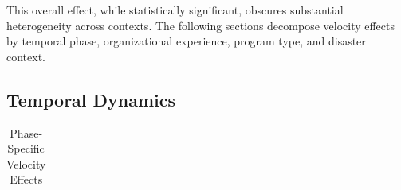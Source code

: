 \documentclass[
  12pt,
  letterpaper,
]{article}
\begin{document}
This overall effect, while statistically significant, obscures
substantial heterogeneity across contexts. The following sections
decompose velocity effects by temporal phase, organizational experience,
program type, and disaster context.

\subsection{Temporal Dynamics}\label{temporal-dynamics}

\begin{longtable}[]{@{}
  >{\raggedright\arraybackslash}p{}
  >{\raggedleft\arraybackslash}p{}
  >{\raggedleft\arraybackslash}p{}
  >{\raggedleft\arraybackslash}p{}
  >{\raggedleft\arraybackslash}p{}
  >{\raggedleft\arraybackslash}p{}
  >{\raggedleft\arraybackslash}p{}
  >{\raggedleft\arraybackslash}p{}
  >{\raggedleft\arraybackslash}p{}@{}}

\caption{\label{tbl-phase}Phase-Specific Velocity Effects}

\tabularnewline


\end{longtable}
\end{document}
